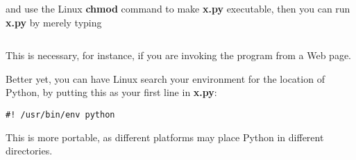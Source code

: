 and use the Linux {\bf chmod} command to make {\bf x.py} executable, then
you can run {\bf x.py} by merely typing

\begin{Verbatim}[fontsize=\relsize{-2}]
% x.py
\end{Verbatim}

This is necessary, for instance, if you are invoking the program from a
Web page.

Better yet, you can have Linux search your environment for the location
of Python, by putting this as your first line in {\bf x.py}:

\begin{Verbatim}[fontsize=\relsize{-2}]
#! /usr/bin/env python
\end{Verbatim}

This is more portable, as different platforms may place Python in
different directories.

